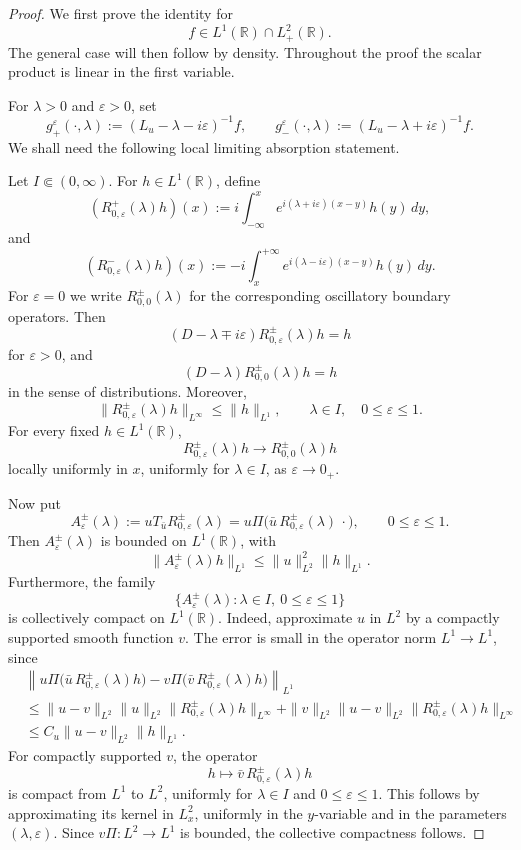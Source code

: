 \documentclass[10pt]{article}
\numberwithin{equation}{section}
\numberwithin{theorem}{section}
\begin{document}
\begin{proof}
We first prove the identity for
\[
f\in L^1(\mathbb R)\cap L^2_+(\mathbb R).
\]
The general case will then follow by density. Throughout the proof the scalar
product is linear in the first variable.

For \(\lambda>0\) and \(\varepsilon>0\), set
\[
g_+^\varepsilon(\cdot,\lambda)
:=
(L_u-\lambda-i\varepsilon)^{-1}f,
\qquad
g_-^\varepsilon(\cdot,\lambda)
:=
(L_u-\lambda+i\varepsilon)^{-1}f .
\]
We shall need the following local limiting absorption statement.

Let \(I\Subset(0,\infty)\). For \(h\in L^1(\mathbb R)\), define
\[
(R_{0,\varepsilon}^+(\lambda)h)(x)
:=
i\int_{-\infty}^x
e^{i(\lambda+i\varepsilon)(x-y)}h(y)\,dy,
\]
and
\[
(R_{0,\varepsilon}^-(\lambda)h)(x)
:=
-i\int_x^{+\infty}
e^{i(\lambda-i\varepsilon)(x-y)}h(y)\,dy.
\]
For \(\varepsilon=0\) we write \(R_{0,0}^\pm(\lambda)\) for the corresponding
oscillatory boundary operators. Then
\[
(D-\lambda\mp i\varepsilon)R_{0,\varepsilon}^{\pm}(\lambda)h=h
\]
for \(\varepsilon>0\), and
\[
(D-\lambda)R_{0,0}^{\pm}(\lambda)h=h
\]
in the sense of distributions. Moreover,
\[
\|R_{0,\varepsilon}^{\pm}(\lambda)h\|_{L^\infty}
\leq
\|h\|_{L^1},
\qquad
\lambda\in I,\quad 0\leq\varepsilon\leq1.
\]
For every fixed \(h\in L^1(\mathbb R)\),
\[
R_{0,\varepsilon}^{\pm}(\lambda)h
\longrightarrow
R_{0,0}^{\pm}(\lambda)h
\]
locally uniformly in \(x\), uniformly for \(\lambda\in I\), as
\(\varepsilon\to0_+\).

Now put
\[
A_{\varepsilon}^{\pm}(\lambda)
:=
uT_{\bar u}R_{0,\varepsilon}^{\pm}(\lambda)
=
u\Pi\bigl(\bar u\,R_{0,\varepsilon}^{\pm}(\lambda)\,\cdot\bigr),
\qquad
0\leq\varepsilon\leq1 .
\]
Then \(A_{\varepsilon}^{\pm}(\lambda)\) is bounded on \(L^1(\mathbb R)\), with
\[
\|A_{\varepsilon}^{\pm}(\lambda)h\|_{L^1}
\leq
\|u\|_{L^2}^2\|h\|_{L^1}.
\]
Furthermore, the family
\[
\{A_{\varepsilon}^{\pm}(\lambda):\lambda\in I,\ 0\leq\varepsilon\leq1\}
\]
is collectively compact on \(L^1(\mathbb R)\). Indeed, approximate \(u\) in
\(L^2\) by a compactly supported smooth function \(v\). The error is small in
the operator norm \(L^1\to L^1\), since
\[
\begin{aligned}
&\left\|
u\Pi\bigl(\bar u\,R_{0,\varepsilon}^{\pm}(\lambda)h\bigr)
-
v\Pi\bigl(\bar v\,R_{0,\varepsilon}^{\pm}(\lambda)h\bigr)
\right\|_{L^1}  \\
&\leq
\|u-v\|_{L^2}\|u\|_{L^2}
\|R_{0,\varepsilon}^{\pm}(\lambda)h\|_{L^\infty}
+
\|v\|_{L^2}\|u-v\|_{L^2}
\|R_{0,\varepsilon}^{\pm}(\lambda)h\|_{L^\infty}  \\
&\leq
C_u\|u-v\|_{L^2}\|h\|_{L^1}.
\end{aligned}
\]
For compactly supported \(v\), the operator
\[
h\mapsto \bar v\,R_{0,\varepsilon}^{\pm}(\lambda)h
\]
is compact from \(L^1\) to \(L^2\), uniformly for
\(\lambda\in I\) and \(0\leq\varepsilon\leq1\). This follows by approximating
its kernel in \(L^2_x\), uniformly in the \(y\)-variable and in the parameters
\((\lambda,\varepsilon)\). Since \(v\Pi:L^2\to L^1\) is bounded, the collective
compactness follows.


\end{proof}
\end{document}
